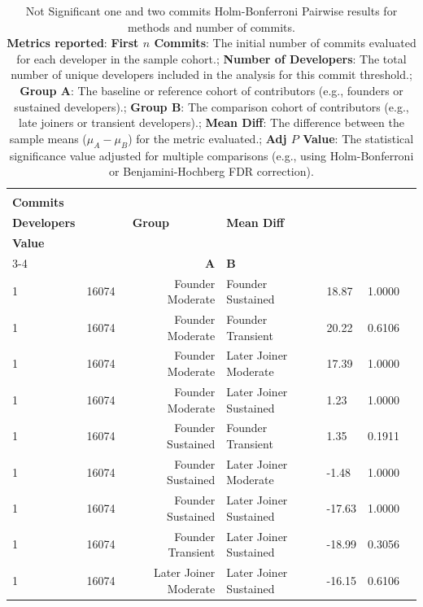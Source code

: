 \begin{table}[H]
\centering
\setlength{\tabcolsep}{2pt}
\caption[Not Significant Holm-Bonferroni Pairwise one and two commits results methods]{Not Significant one and two commits Holm-Bonferroni Pairwise results for methods and number of commits. \\ \textbf{Metrics reported}:   \textbf{First $n$ Commits}: The initial number of commits evaluated for each developer in the sample cohort.;  \textbf{Number of Developers}: The total number of unique developers included in the analysis for this commit threshold.;  \textbf{Group A}: The baseline or reference cohort of contributors (e.g., founders or sustained developers).;  \textbf{Group B}: The comparison cohort of contributors (e.g., late joiners or transient developers).;  \textbf{Mean Diff}: The difference between the sample means ($\mu_A - \mu_B$) for the metric evaluated.;  \textbf{Adj $P$ Value}: The statistical significance value adjusted for multiple comparisons (e.g., using Holm-Bonferroni or Benjamini-Hochberg FDR correction).
}
\begin{tabular}{l r r l l r r}
\toprule
\makecell[t]{\textbf{First $n$}\\\textbf{Commits}} & \makecell[t]{\textbf{Number of}\\\textbf{Developers}} & \multicolumn{2}{c}{\textbf{Group}} & \textbf{Mean Diff} & \makecell[t]{\textbf{Adj $P$}\\\textbf{Value}} \\ 
\cmidrule(lr){3-4}
 &  & \textbf{A} & \textbf{B} &  &  \\ 
\midrule
1 & 16074 & Founder Moderate & Founder Sustained & 18.87 & 1.0000 \\ 
1 & 16074 & Founder Moderate & Founder Transient & 20.22 & 0.6106 \\ 
1 & 16074 & Founder Moderate & Later Joiner Moderate & 17.39 & 1.0000 \\ 
1 & 16074 & Founder Moderate & Later Joiner Sustained & 1.23 & 1.0000 \\ 
1 & 16074 & Founder Sustained & Founder Transient & 1.35 & 0.1911 \\ 
1 & 16074 & Founder Sustained & Later Joiner Moderate & -1.48 & 1.0000 \\ 
1 & 16074 & Founder Sustained & Later Joiner Sustained & -17.63 & 1.0000 \\ 
1 & 16074 & Founder Transient & Later Joiner Sustained & -18.99 & 0.3056 \\ 
1 & 16074 & Later Joiner Moderate & Later Joiner Sustained & -16.15 & 0.6106 \\ 

\end{tabular}
\end{table}
